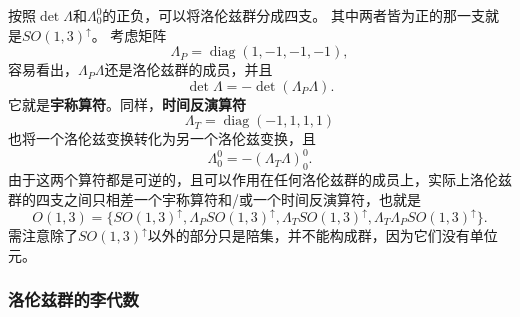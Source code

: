\documentclass[hyperref, UTF8, a4paper]{ctexart}
\DeclareMathOperator{\diag}{diag}
\begin{document}
按照$\det \Lambda$和$\Lambda_0^0$的正负，可以将洛伦兹群分成四支。
其中两者皆为正的那一支就是$SO(1,3)^\uparrow$。
考虑矩阵
\begin{equation}
    \Lambda_P = \diag (1, -1, -1, -1), 
\end{equation}
容易看出，$\Lambda_P \Lambda$还是洛伦兹群的成员，并且
\[
    \det \Lambda = - \det (\Lambda_P \Lambda).
\]
它就是\textbf{宇称算符}。同样，\textbf{时间反演算符}
\begin{equation}
    \Lambda_T = \diag(-1, 1, 1, 1)
\end{equation}
也将一个洛伦兹变换转化为另一个洛伦兹变换，且
\[
    \Lambda_0^0 = - (\Lambda_T \Lambda)_0^0.
\]
由于这两个算符都是可逆的，且可以作用在任何洛伦兹群的成员上，实际上洛伦兹群的四支之间只相差一个宇称算符和/或一个时间反演算符，也就是
\begin{equation}
    O(1, 3) = \{ SO(1,3)^\uparrow, \Lambda_P SO(1,3)^\uparrow, \Lambda_T SO(1,3)^\uparrow, \Lambda_T \Lambda_P SO(1,3)^\uparrow \}.
    \label{eq:4-parts-of-o13}
\end{equation}
需注意除了$SO(1,3)^\uparrow$以外的部分只是陪集，并不能构成群，因为它们没有单位元。

\subsubsection{洛伦兹群的李代数}
\end{document}
